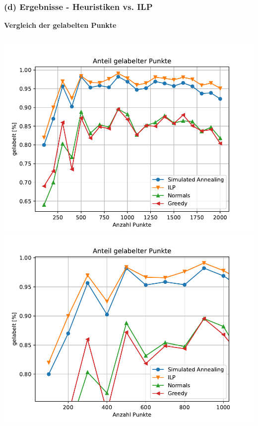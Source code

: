 \documentclass[aspectratio=169]{beamer}
\begin{document}
\begin{frame}
	\frametitle{(d) Ergebnisse - Heuristiken vs. ILP}
	\textbf{Vergleich der gelabelten Punkte}
	\begin{columns}[c] %
	
	
	\includegraphics[scale=.45]{gelabelt_all.pdf}
	\includegraphics[scale=.45]{gelabelt_detail.pdf}
	

	\end{columns}

	\end{frame}
\end{document}
